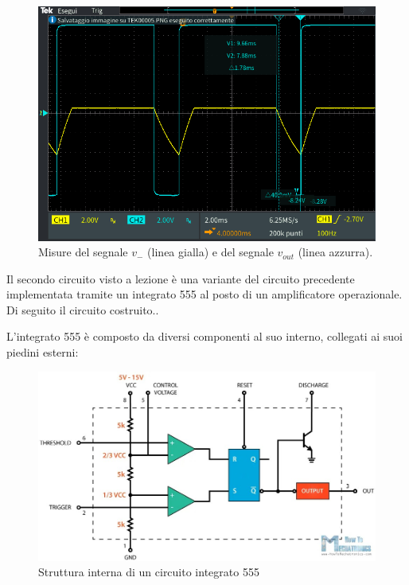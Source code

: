 \begin{figure}[h!]
	\centering
	\includegraphics[width=\linewidth]{./ImageFiles/Laboratorio 4/TEK00006.PNG}
	\caption{Misure del segnale $v_{-}$ (linea gialla) e del segnale $v_{out}$ (linea azzurra).}
	\label{fig:calcolo_ta}
\end{figure}

\newpage
Il secondo circuito visto a lezione è una variante del circuito precedente implementata tramite un integrato 555 al posto di un amplificatore operazionale. Di seguito il circuito costruito..

\noindent
L'integrato 555 è composto da diversi componenti al suo interno, collegati ai suoi piedini esterni:

\begin{figure}[h!]
	\centering
	\includegraphics[width=\linewidth]{./ImageFiles/Laboratorio 4/555internals.jpg}
	\caption{Struttura interna di un circuito integrato 555}
	\label{fig:555_internals}
\end{figure}

